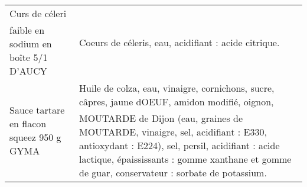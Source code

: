 \begin{longtable}{p{5cm}p{10cm}}
                                                     Curs de céleri faible en sodium en boîte 5/1 D'AUCY &                                                                                                                                                                                                                                                                                                                                                                                                                                                                                                                                                                                                                                                                                                                                                                                                                                                                                                                                                                                     Coeurs de céleris, eau, acidifiant : acide citrique. \\
                                                                Sauce tartare en flacon squeez 950 g GYMA &                                                                                                                                                                                                                                                                                                                                                                                                                                                                                                                                                                                                                                                                                                      Huile de colza, eau, vinaigre, cornichons, sucre, câpres, jaune dOEUF, amidon modifié, oignon, MOUTARDE de Dijon (eau, graines de MOUTARDE, vinaigre, sel, acidifiant : E330, antioxydant : E224), sel, persil, acidifiant : acide lactique, épaississants : gomme xanthane et gomme de guar, conservateur : sorbate de potassium. \\

\end{longtable}
